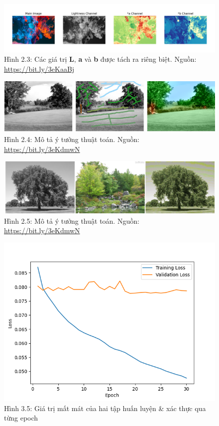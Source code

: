 \documentclass[a4paper]{article}
\begin{document}
\begin{figure}[h!]
\centering
\includegraphics[width=16.1cm]{images/2_3.jpeg}
\caption*{Hình 2.3: Các giá trị \textbf{L}, \textbf{a} và \textbf{b} được tách ra riêng biệt. Nguồn: \href{https://bit.ly/3eKaaBj}{https://bit.ly/3eKaaBj}}
\end{figure}

\begin{figure}[h!]
\centering
\includegraphics[width=15cm]{images/2_4.png}
\caption*{Hình 2.4: Mô tả ý tưởng thuật toán. Nguồn: \href{https://bit.ly/3eKdmwN}{https://bit.ly/3eKdmwN}}
\end{figure}

\begin{figure}[h!]
\centering
\includegraphics[width=15cm]{images/2_5.png}
\caption*{Hình 2.5: Mô tả ý tưởng thuật toán. Nguồn: \href{https://bit.ly/3eKdmwN}{https://bit.ly/3eKdmwN}}
\end{figure}

\begin{figure}[h!]
\centering
\includegraphics[width=15cm]{images/3_5.png}
\caption*{Hình 3.5: Giá trị mất mát của hai tập huấn luyện \& xác thực qua từng epoch}
\end{figure}
\end{document}
